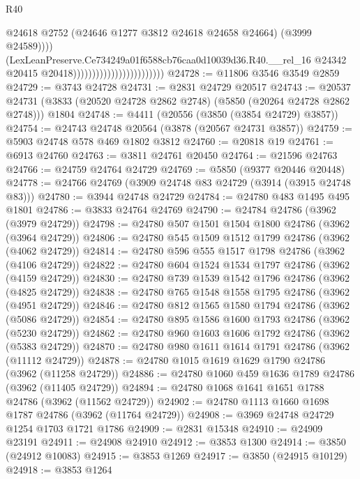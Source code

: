 \begin{lexlean}{R40}
\begin{coremodule}
                                                        @24618
                                                        @2752
                                                        (@24646 @1277 @3812 @24618 @24658 @24664)
                                                        (@3999 @24589))))
                                                  (LexLeanPreserve.Ce734249a01f6588cb76caa0d10039d36.R40.__rel_16
                                                    @24342
                                                    @20415
                                                    @20418))))))))))))))))))))))))
@24728 := @11806 @3546 @3549 @2859
@24729 := @3743 @24728
@24731 := @2831 @24729 @20517
@24743 := @20537
    @24731
    (@3833 (@20520 @24728 @2862 @2748) (@5850 (@20264 @24728 @2862 @2748)))
    @1804
@24748 := @4411 (@20556 (@3850 (@3854 @24729) @3857))
@24754 := @24743 @24748 @20564 (@3878 (@20567 @24731 @3857))
@24759 := @5903 @24748 @578 @469 @1802 @3812
@24760 := @20818 @19
@24761 := @6913 @24760
@24763 := @3811 @24761 @20450
@24764 := @21596 @24763
@24766 := @24759 @24764 @24729
@24769 := @5850 (@9377 @20446 @20448)
@24778 := @24766 @24769 (@3909 @24748 @83 @24729 (@3914 (@3915 @24748 @83)))
@24780 := @3944 @24748 @24729
@24784 := @24780 @483 @1495 @495 @1801
@24786 := @3833 @24764 @24769
@24790 := @24784 @24786 (@3962 (@3979 @24729))
@24798 := @24780 @507 @1501 @1504 @1800 @24786 (@3962 (@3964 @24729))
@24806 := @24780 @545 @1509 @1512 @1799 @24786 (@3962 (@4062 @24729))
@24814 := @24780 @596 @555 @1517 @1798 @24786 (@3962 (@4106 @24729))
@24822 := @24780 @604 @1524 @1534 @1797 @24786 (@3962 (@4159 @24729))
@24830 := @24780 @739 @1539 @1542 @1796 @24786 (@3962 (@4825 @24729))
@24838 := @24780 @765 @1548 @1558 @1795 @24786 (@3962 (@4951 @24729))
@24846 := @24780 @812 @1565 @1580 @1794 @24786 (@3962 (@5086 @24729))
@24854 := @24780 @895 @1586 @1600 @1793 @24786 (@3962 (@5230 @24729))
@24862 := @24780 @960 @1603 @1606 @1792 @24786 (@3962 (@5383 @24729))
@24870 := @24780 @980 @1611 @1614 @1791 @24786 (@3962 (@11112 @24729))
@24878 := @24780 @1015 @1619 @1629 @1790 @24786 (@3962 (@11258 @24729))
@24886 := @24780 @1060 @459 @1636 @1789 @24786 (@3962 (@11405 @24729))
@24894 := @24780 @1068 @1641 @1651 @1788 @24786 (@3962 (@11562 @24729))
@24902 := @24780 @1113 @1660 @1698 @1787 @24786 (@3962 (@11764 @24729))
@24908 := @3969 @24748 @24729 @1254 @1703 @1721 @1786
@24909 := @2831 @15348
@24910 := @24909 @23191
@24911 := @24908 @24910
@24912 := @3853 @1300
@24914 := @3850 (@24912 @10083)
@24915 := @3853 @1269
@24917 := @3850 (@24915 @10129)
@24918 := @3853 @1264

\end{coremodule}
\end{lexlean}
